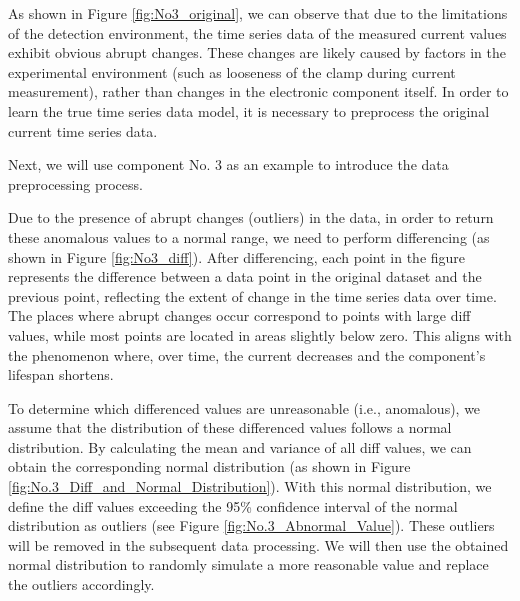 As shown in Figure \ref{fig:No3_original}, we can observe that due to the limitations of the detection environment, the time series data of the measured current values exhibit obvious abrupt changes. These changes are likely caused by factors in the experimental environment (such as looseness of the clamp during current measurement), rather than changes in the electronic component itself. In order to learn the true time series data model, it is necessary to preprocess the original current time series data.


Next, we will use component No. 3 as an example to introduce the data preprocessing process.

Due to the presence of abrupt changes (outliers) in the data, in order to return these anomalous values to a normal range, we need to perform differencing (as shown in Figure \ref{fig:No3_diff}). After differencing, each point in the figure represents the difference between a data point in the original dataset and the previous point, reflecting the extent of change in the time series data over time. The places where abrupt changes occur correspond to points with large diff values, while most points are located in areas slightly below zero. This aligns with the phenomenon where, over time, the current decreases and the component's lifespan shortens.


To determine which differenced values are unreasonable (i.e., anomalous), we assume that the distribution of these differenced values follows a normal distribution. By calculating the mean and variance of all diff values, we can obtain the corresponding normal distribution (as shown in Figure \ref{fig:No.3_Diff_and_Normal_Distribution}). With this normal distribution, we define the diff values exceeding the 95\% confidence interval of the normal distribution as outliers (see Figure \ref{fig:No.3_Abnormal_Value}). These outliers will be removed in the subsequent data processing. We will then use the obtained normal distribution to randomly simulate a more reasonable value and replace the outliers accordingly.


